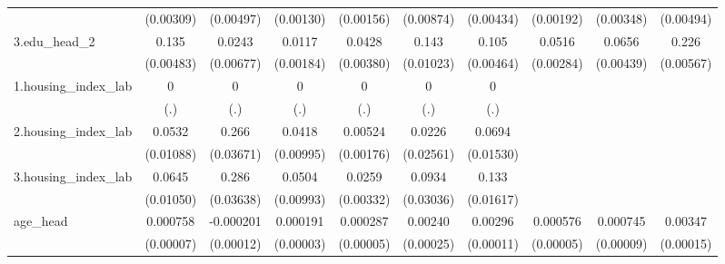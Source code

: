 \begin{table}[htbp]
\begin{tabular}{l*{9}{c}}
            &   (0.00309)         &   (0.00497)         &   (0.00130)         &   (0.00156)         &   (0.00874)         &   (0.00434)         &   (0.00192)         &   (0.00348)         &   (0.00494)         \\
3.edu\_head\_2&       0.135\sym{***}&      0.0243\sym{***}&      0.0117\sym{***}&      0.0428\sym{***}&       0.143\sym{***}&       0.105\sym{***}&      0.0516\sym{***}&      0.0656\sym{***}&       0.226\sym{***}\\
            &   (0.00483)         &   (0.00677)         &   (0.00184)         &   (0.00380)         &   (0.01023)         &   (0.00464)         &   (0.00284)         &   (0.00439)         &   (0.00567)         \\
1.housing\_index\_lab&           0         &           0         &           0         &           0         &           0         &           0         &                     &                     &                     \\
            &         (.)         &         (.)         &         (.)         &         (.)         &         (.)         &         (.)         &                     &                     &                     \\
2.housing\_index\_lab&      0.0532\sym{***}&       0.266\sym{***}&      0.0418\sym{***}&     0.00524\sym{***}&      0.0226         &      0.0694\sym{***}&                     &                     &                     \\
            &   (0.01088)         &   (0.03671)         &   (0.00995)         &   (0.00176)         &   (0.02561)         &   (0.01530)         &                     &                     &                     \\
3.housing\_index\_lab&      0.0645\sym{***}&       0.286\sym{***}&      0.0504\sym{***}&      0.0259\sym{***}&      0.0934\sym{***}&       0.133\sym{***}&                     &                     &                     \\
            &   (0.01050)         &   (0.03638)         &   (0.00993)         &   (0.00332)         &   (0.03036)         &   (0.01617)         &                     &                     &                     \\
age\_head    &    0.000758\sym{***}&   -0.000201\sym{*}  &    0.000191\sym{***}&    0.000287\sym{***}&     0.00240\sym{***}&     0.00296\sym{***}&    0.000576\sym{***}&    0.000745\sym{***}&     0.00347\sym{***}\\
            &   (0.00007)         &   (0.00012)         &   (0.00003)         &   (0.00005)         &   (0.00025)         &   (0.00011)         &   (0.00005)         &   (0.00009)         &   (0.00015)         \\

\end{tabular}
\end{table}
